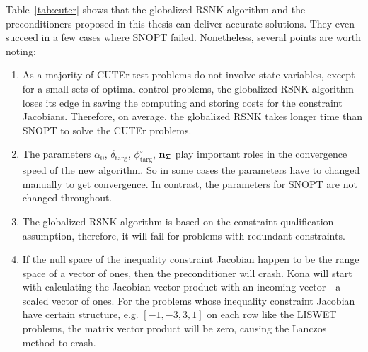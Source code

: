 Table~\ref{tab:cuter} shows that the globalized RSNK algorithm and the preconditioners proposed in this thesis can deliver accurate solutions. They even succeed in a few cases where SNOPT failed. Nonetheless, several points are worth noting:
\begin{enumerate}
\item As a majority of CUTEr test problems do not involve state variables, except for a small sets of optimal control problems, the globalized RSNK algorithm loses its edge in saving the computing and storing costs for the constraint Jacobians. Therefore, on average, the globalized RSNK takes longer time than SNOPT to solve the CUTEr problems. 
\item The parameters \textbf{$\alpha_0$},  $\delta_{\text{targ}}$, $\phi^{\circ}_{\text{targ}}$,  $\mathbf{{n_{\mathsf{\Sigma}}}}$ play important roles in the convergence speed of the new algorithm. So in some cases the parameters have to changed manually to get convergence. In contrast, the parameters for SNOPT are not changed throughout. 
\item The globalized RSNK algorithm is based on the constraint qualification assumption, therefore, it will fail for problems with redundant constraints.    
\item If the null space of the inequality constraint Jacobian happen to be the range space of  a vector of ones, then the preconditioner will crash. Kona will start with calculating the Jacobian vector product with an incoming vector - a scaled vector of ones. For the problems whose inequality constraint Jacobian have certain structure, e.g. $[-1, -3, 3, 1]$ on each row like the LISWET problems, the matrix vector product will be zero, causing the Lanczos method to crash. 
\end{enumerate} 



